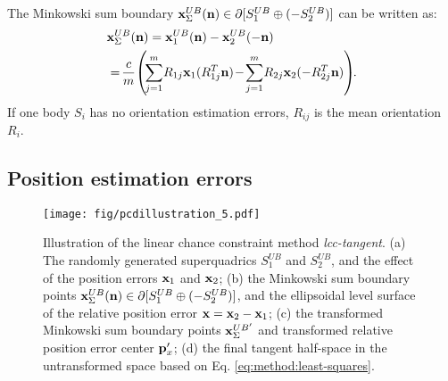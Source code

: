 \documentclass[conference]{IEEEtran}
\newcommand{\xx}{{\bf x}}
\newcommand{\pp}{{\bf p}}
\newcommand{\nn}{{\bf n}}
\begin{document}
The Minkowski sum boundary $\xx_\Sigma^{UB}(\nn) \in \partial[S_1^{UB}\oplus(-S_2^{UB})]$ can be written as:
\begin{equation}
\label{eq:method:enlarged-minksum}
\begin{aligned}
&\xx_\Sigma^{UB}(\nn) =\xx_1^{UB}(\nn) - \xx_2^{UB}(-\nn) \\
&=\hskip -0.02in \frac{c}{m} \hskip -0.02in \left( \hskip -0.02in \sum_{j=1}^{m}  \hskip -0.02in R_{1j} \xx_1(R_{1j}^T\nn) \hskip -0.02in - \hskip -0.02in \sum_{j=1}^{m}  \hskip -0.02in R_{2j} \xx_2(-R_{2j}^T\nn) \right)  \hskip -0.04in .\\
\end{aligned}
\end{equation}
If one body $S_i$ has no orientation estimation errors, $R_{ij}$ is the mean orientation $R_i$. 

\subsection{Position estimation errors}

\begin{figure*}[tb]
\centering 
\texttt{[image: fig/pcdillustration\_5.pdf]}
\caption{Illustration of the linear chance constraint method \textit{\textit{lcc-tangent}}. (a) The randomly generated superquadrics $S_1^{UB}$ and $S_2^{UB}$, and the effect of the position errors $\xx_1$ and $\xx_2$; (b) the Minkowski sum boundary points $\xx_\Sigma^{UB}(\nn) \in \partial[S_1^{UB} \oplus (-S_2^{UB})]$, and the ellipsoidal level surface of the relative position error $\xx=\xx_2-\xx_1$; (c) the transformed Minkowski sum boundary points $\xx_\Sigma^{UB'}$ and transformed relative position error center $\pp_x'$; (d) the final tangent half-space in the untransformed space based on Eq. \ref{eq:method:least-squares}.}
\label{fig:method:half-plane}
\end{figure*}
\end{document}
